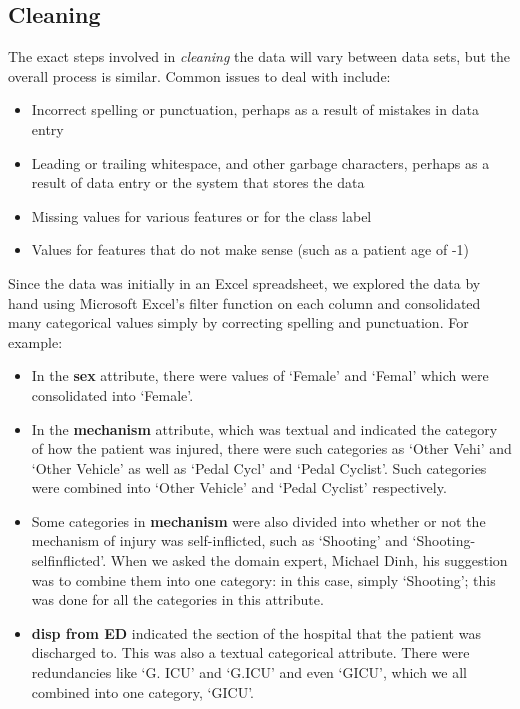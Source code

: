 \subsection{Cleaning} %
The exact steps involved in \textit{cleaning} the data will vary between data
sets, but the overall process is similar. Common issues to deal with include:
\begin{itemize}
\item Incorrect spelling or punctuation, perhaps as a result of mistakes in
data entry
\item Leading or trailing whitespace, and other garbage characters,
perhaps as a result of data entry or
the system that stores the data
\item Missing values for various features or for the class label
\item Values for features that do not make sense (such as a patient age of
-1)
\end{itemize}

Since the data was initially in an Excel spreadsheet, we explored the data
by hand using Microsoft Excel's filter function on each column and
consolidated many categorical values simply
by correcting spelling and punctuation. For example:
\begin{itemize}
  \item In the \textbf{sex} attribute, there were values of `Female' and
  `Femal' which were consolidated into `Female'.
  \item In the \textbf{mechanism} attribute, which was textual and indicated
  the category of how the patient was injured, there were such categories as
  `Other Vehi' and `Other Vehicle' as well as `Pedal Cycl' and `Pedal Cyclist'.
  Such categories were combined into `Other Vehicle' and `Pedal Cyclist'
  respectively.
  \item Some categories in \textbf{mechanism} were also divided into whether or
  not the mechanism of injury was self-inflicted, such as `Shooting' and
  `Shooting-selfinflicted'. When we asked the domain expert, Michael Dinh, his
  suggestion was to combine them into one category: in this case, simply
  `Shooting'; this was done for all the categories in this attribute.
  \item \textbf{disp from ED} indicated the section of the hospital that the
  patient was discharged to. This was also a textual categorical attribute.
  There were redundancies like `G. ICU' and `G.ICU' and even `GICU', which we
  all combined into one category, `GICU'.
\end{itemize}


